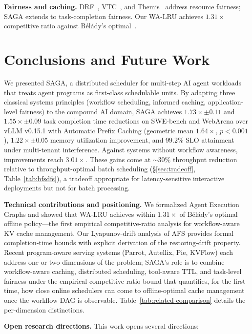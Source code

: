 \documentclass[sigconf]{acmart}
\newcommand{\sysname}{SAGA\xspace}
\begin{document}
\textbf{Fairness and caching.} DRF~\cite{ghodsi2011drf}, VTC~\cite{sheng2024vtc}, and Themis~\cite{mahajan2020themis} address resource fairness; \sysname extends to task-completion fairness. Our WA-LRU achieves $1.31\times$ competitive ratio against B\'{e}l\'{a}dy's optimal~\cite{belady1966replacement}.

\section{Conclusions and Future Work}
\label{sec:conclusion}

We presented \sysname, a distributed scheduler for multi-step AI agent workloads that treats agent programs as first-class schedulable units. By adapting three classical systems principles (workflow scheduling, informed caching, application-level fairness) to the compound AI domain, \sysname achieves $1.73\times \pm 0.11$ and $1.55\times \pm 0.09$ task completion time reductions on SWE-bench and WebArena over vLLM v0.15.1 with Automatic Prefix Caching (geometric mean $1.64\times$, $p < 0.001$), $1.22\times \pm 0.05$ memory utilization improvement, and 99.2\% SLO attainment under multi-tenant interference. Against systems without workflow awareness, improvements reach $3.01\times$. These gains come at $\sim$30\% throughput reduction relative to throughput-optimal batch scheduling (\S\ref{sec:tradeoff}, Table~\ref{tab:bfsdfs}), a tradeoff appropriate for latency-sensitive interactive deployments but not for batch processing.

\textbf{Technical contributions and positioning.} We formalized Agent Execution Graphs and showed that WA-LRU achieves within $1.31\times$ of B\'el\'ady's optimal offline policy---the first empirical competitive-ratio analysis for workflow-aware KV cache management. Our Lyapunov-drift analysis of AFS provides formal completion-time bounds with explicit derivation of the restoring-drift property. Recent program-aware serving systems (Parrot, Autellix, Pie, KVFlow) each address one or two dimensions of the problem; \sysname's role is to combine workflow-aware caching, distributed scheduling, tool-aware TTL, and task-level fairness under the empirical competitive-ratio bound that quantifies, for the first time, how close online schedulers can come to offline-optimal cache management once the workflow DAG is observable. Table~\ref{tab:related-comparison} details the per-dimension distinctions.

\textbf{Open research directions.} This work opens several directions:
\end{document}
